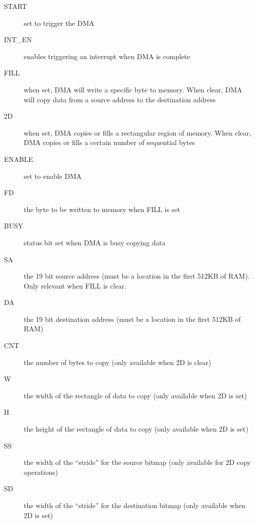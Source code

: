 \begin{description}
    \item[START] set to trigger the DMA

    \item[INT\_EN] enables triggering an interrupt when DMA is complete

    \item[FILL] when set, DMA will write a specific byte to memory. When clear, DMA will copy data from a source address to the destination address

    \item[2D] when set, DMA copies or fills a rectangular region of memory. When clear, DMA copies or fills a certain number of sequential bytes

    \item[ENABLE] set to enable DMA

    \item[FD] the byte to be written to memory when FILL is set

    \item[BUSY] status bit set when DMA is busy copying data

    \item[SA] the 19 bit source address (must be a location in the first 512KB of RAM). Only relevant when FILL is clear.

    \item[DA] the 19 bit destination address (must be a location in the first 512KB of RAM)

    \item[CNT] the number of bytes to copy (only available when 2D is clear)

    \item[W] the width of the rectangle of data to copy (only available when 2D is set)

    \item[H] the height of the rectangle of data to copy (only available when 2D is set)

    \item[SS] the width of the ``stride'' for the source bitmap (only available for 2D copy operations)

    \item[SD] the width of the ``stride'' for the destination bitmap (only available when 2D is set)
\end{description}

